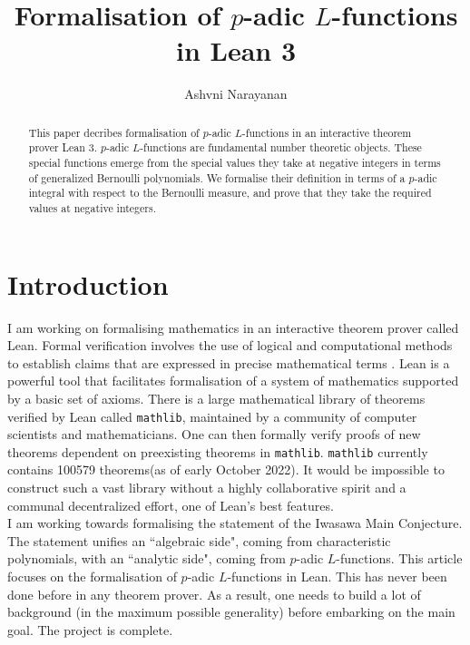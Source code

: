 \documentclass[a4paper,UKenglish,cleveref, autoref, thm-restate]{lipics-v2021}
\title{Formalisation of $p$-adic $L$-functions in Lean 3} %
\author{Ashvni Narayanan}{London School of Geometry and Number Theory}{a.narayanan20@imperial.ac.uk}{https://orcid.org/0000-0003-2777-4228}{EPSRC Grant EP/S021590/1 (UK)}%
\newcommand{\lean}[1]{\texttt{#1}\xspace} %
\begin{document}
\maketitle

\begin{abstract}
This paper decribes formalisation of $p$-adic $L$-functions in an interactive theorem prover Lean 3. $p$-adic 
$L$-functions are fundamental number theoretic objects. These special functions emerge from the special 
values they take at negative integers in terms of generalized Bernoulli polynomials. We formalise their 
definition in terms of a $p$-adic integral with respect to the Bernoulli measure, and prove that they 
take the required values at negative integers.
\end{abstract}

\section{Introduction}
I am working on formalising mathematics in an interactive theorem prover called Lean. 
Formal verification involves the use of logical and computational methods to establish 
claims that are expressed in precise mathematical terms \cite{TPIL}. Lean is a powerful tool 
that facilitates formalisation of a system of mathematics supported by a basic set of axioms. There is a large mathematical library of theorems verified by Lean called \lean{mathlib}, maintained by a community of computer scientists and mathematicians. One can then 
formally verify proofs of new theorems dependent on preexisting theorems in \lean{mathlib}. 
\lean{mathlib} currently contains 100579 theorems(as of early October 2022). It would be impossible to construct 
such a vast library without a highly collaborative spirit and a communal decentralized effort, one of 
Lean's best features. \\
I am working towards formalising the statement of the Iwasawa Main Conjecture.
The statement unifies an ``algebraic side", coming from characteristic polynomials,
with an ``analytic side", coming from $p$-adic $L$-functions. This article focuses on the 
formalisation of $p$-adic $L$-functions in Lean. This has never been done before in any 
theorem prover. As a result, one needs to build a lot of background (in the maximum possible generality) 
before embarking on the main goal. The project is complete. \\
\end{document}
